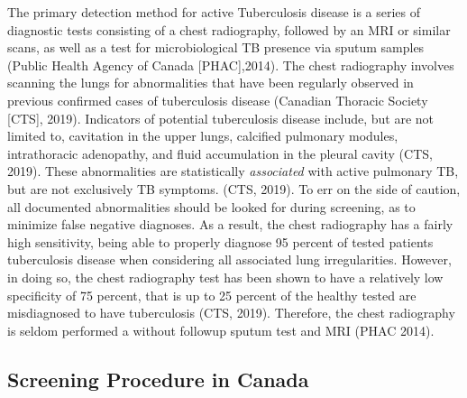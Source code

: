 \documentclass[sn-mathphys,Numbered]{sn-jnl}%
\theoremstyle{thmstyleone}%
\theoremstyle{thmstyletwo}%
\theoremstyle{thmstylethree}%
\begin{document}
    The primary detection method for active Tuberculosis disease is a series of diagnostic tests consisting of a chest radiography, followed by an MRI or similar scans, as well as a test for microbiological TB presence via sputum samples (Public Health Agency of Canada [PHAC],2014). The chest radiography involves scanning the lungs for abnormalities that have been regularly observed in previous confirmed cases of tuberculosis disease (Canadian Thoracic Society [CTS], 2019). Indicators of potential tuberculosis disease include, but are not limited to, cavitation in the upper lungs, calcified pulmonary modules, intrathoracic adenopathy, and fluid accumulation in the pleural cavity (CTS, 2019). These abnormalities are statistically \textit{associated} with active pulmonary TB, but are not exclusively TB symptoms. (CTS, 2019). To err on the side of caution, all documented abnormalities should be looked for during screening, as to minimize false negative diagnoses. As a result, the chest radiography has a fairly high sensitivity, being able to properly diagnose 95 percent of tested patients tuberculosis disease when considering all associated lung irregularities. However, in doing so, the chest radiography test has been shown to have a relatively low specificity of 75 percent, that is up to 25 percent of the healthy tested are misdiagnosed to have tuberculosis (CTS, 2019). Therefore, the chest radiography is seldom performed a without followup sputum test and MRI (PHAC 2014).


\subsection{Screening Procedure in Canada}

    
\end{document}
